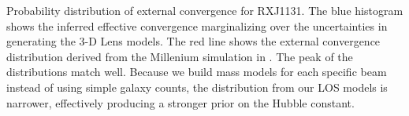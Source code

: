 \label{fig:suyu} Probability distribution of external convergence for RXJ1131. The blue histogram shows the inferred effective convergence marginalizing over the uncertainties in generating the 3-D Lens models. The red line shows the external convergence distribution derived from the Millenium simulation in \citet{Suyu13}. The peak of the distributions match well. Because we build mass models for each specific beam instead of using simple galaxy counts, the distribution from our LOS models is narrower, effectively producing a stronger prior on the Hubble constant.